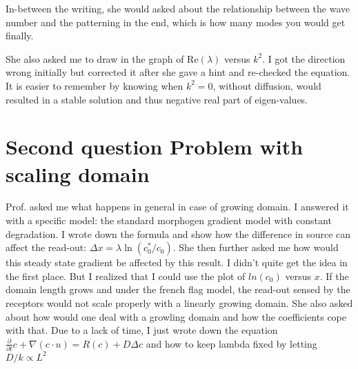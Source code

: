 \documentclass[a4paper,12pt]{article}
\begin{document}
In-between the writing, she would asked about the relationship between the wave number and the patterning in the end, which is how many modes you would get finally.

She also asked me to draw in the graph of $\mathrm{Re}(\lambda)$ versus $k^2$. I got the direction wrong initially but corrected it after she gave a hint and re-checked the equation. It is easier to remember by knowing when $k^2 = 0$, without diffusion, would resulted in a stable solution and thus negative real part of eigen-values.

\section{Second question Problem with scaling domain}

Prof. asked me what happens in general in case of growing domain. I answered it with a specific model: the standard morphogen gradient model with constant degradation. I wrote down the formula and show how the difference in source can affect the read-out: $\Delta x = \lambda \ln{(c_0^*/c_0)}$. She then further asked me how would this steady state gradient be affected by this result. I didn't quite get the idea in the first place. But I realized that I could use the plot of $ln(c_0)$ versus $x$. If the domain length grows and under the french flag model, the read-out sensed by the receptors would not scale properly with a linearly growing domain. She also asked about how would one deal with a growling domain and how the coefficients cope with that. Due to a lack of time, I just wrote down the equation $\frac{\partial}{\partial t} c + \nabla(c\cdot u) = R(c) + D \Delta c$ and how to keep lambda fixed by letting $D/k \propto L^2$
\end{document}
